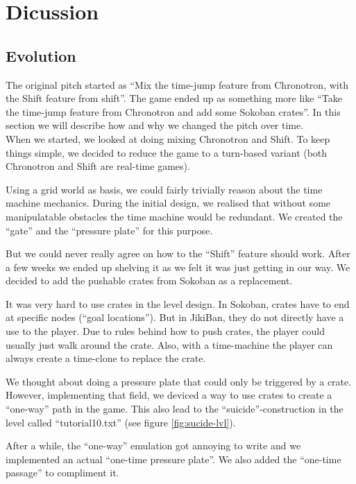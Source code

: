 \section{Dicussion}

\subsection{Evolution}
The original pitch started as ``Mix the time-jump feature from
Chronotron, with the Shift feature from shift''.  The game ended up as
something more like ``Take the time-jump feature from Chronotron and
add some Sokoban crates''.  In this section we will describe how and why
we changed the pitch over time.\\


When we started, we looked at doing mixing Chronotron and Shift.  To
keep things simple, we decided to reduce the game to a turn-based
variant (both Chronotron and Shift are real-time games).

Using a grid world as basis, we could fairly trivially reason about
the time machine mechanics.  During the initial design, we realised
that without some manipulatable obstacles the time machine would be
redundant.  We created the ``gate'' and the ``pressure plate'' for
this purpose.

But we could never really agree on how to the ``Shift'' feature should
work.  After a few weeks we ended up shelving it as we felt it was
just getting in our way.  We decided to add the pushable crates from
Sokoban as a replacement.

It was very hard to use crates in the level design.  In Sokoban,
crates have to end at specific nodes (``goal locations'').  But in
JikiBan, they do not directly have a use to the player.  Due to rules
behind how to push crates, the player could usually just walk around
the crate.  Also, with a time-machine the player can always create a
time-clone to replace the crate.

We thought about doing a pressure plate that could only be triggered
by a crate.  However, implementing that field, we deviced a way to use
crates to create a ``one-way'' path in the game.  This also lead to
the ``suicide''-construction in the level called ``tutorial10.txt''
(see figure \ref{fig:sucide-lvl}).

After a while, the ``one-way'' emulation got annoying to write and we
implemented an actual ``one-time pressure plate''.  We also added the
``one-time passage'' to compliment it.

